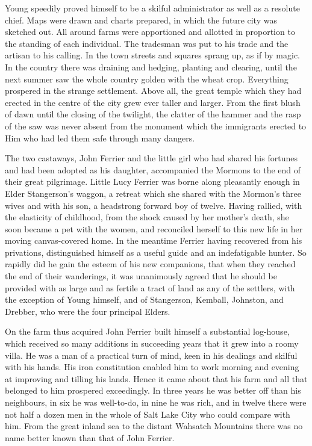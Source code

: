\documentclass[12pt,english]{book}
\begin{document}
Young speedily proved himself to be a skilful administrator as well
as a resolute chief. Maps were drawn and charts prepared, in which
the future city was sketched out. All around farms were apportioned
and allotted in proportion to the standing of each individual. The
tradesman was put to his trade and the artisan to his calling. In
the town streets and squares sprang up, as if by magic. In the country
there was draining and hedging, planting and clearing, until the next
summer saw the whole country golden with the wheat crop. Everything
prospered in the strange settlement. Above all, the great temple which
they had erected in the centre of the city grew ever taller and larger.
From the first blush of dawn until the closing of the twilight, the
clatter of the hammer and the rasp of the saw was never absent from
the monument which the immigrants erected to Him who had led them
safe through many dangers.

The two castaways, John Ferrier and the little girl who had shared
his fortunes and had been adopted as his daughter, accompanied the
Mormons to the end of their great pilgrimage. Little Lucy Ferrier
was borne along pleasantly enough in Elder Stangerson's waggon, a
retreat which she shared with the Mormon's three wives and with his
son, a headstrong forward boy of twelve. Having rallied, with the
elasticity of childhood, from the shock caused by her mother's death,
she soon became a pet with the women, and reconciled herself to this
new life in her moving canvas-covered home. In the meantime Ferrier
having recovered from his privations, distinguished himself as a useful
guide and an indefatigable hunter. So rapidly did he gain the esteem
of his new companions, that when they reached the end of their wanderings,
it was unanimously agreed that he should be provided with as large
and as fertile a tract of land as any of the settlers, with the exception
of Young himself, and of Stangerson, Kemball, Johnston, and Drebber,
who were the four principal Elders.

On the farm thus acquired John Ferrier built himself a substantial
log-house, which received so many additions in succeeding years that
it grew into a roomy villa. He was a man of a practical turn of mind,
keen in his dealings and skilful with his hands. His iron constitution
enabled him to work morning and evening at improving and tilling his
lands. Hence it came about that his farm and all that belonged to
him prospered exceedingly. In three years he was better off than his
neighbours, in six he was well-to-do, in nine he was rich, and in
twelve there were not half a dozen men in the whole of Salt Lake City
who could compare with him. From the great inland sea to the distant
Wahsatch Mountains there was no name better known than that of John
Ferrier.
\end{document}
